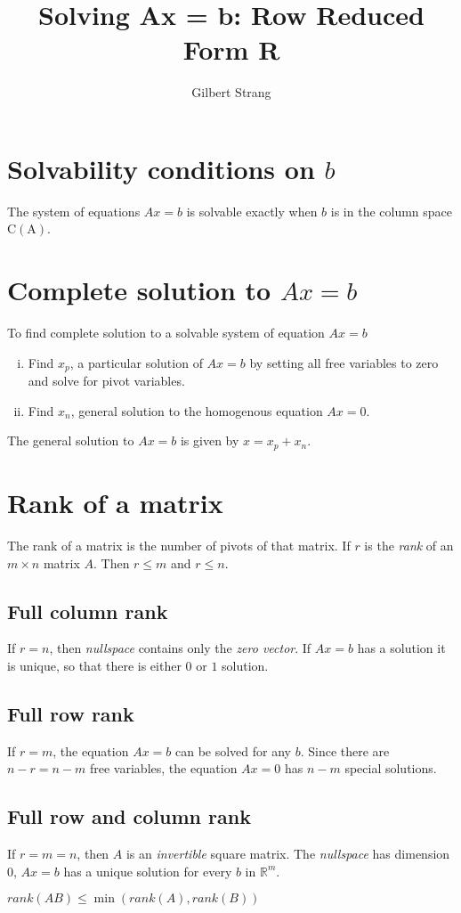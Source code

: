 \documentclass{tufte-handout}
\author{Gilbert Strang}
\title{Solving Ax = b: Row Reduced Form R}
\begin{document}
\maketitle

\section{Solvability conditions on $b$}
The system of equations $Ax = b$ is solvable exactly when $b$ is in
the column space $\mathrm{C(A)}$.

\section{Complete solution to $Ax = b$}
To find complete solution to a solvable system of equation $Ax = b$

\begin{enumerate}[(i)]
\item Find $x_p$, a particular solution of $Ax = b$ by setting all
free variables to zero and solve for pivot variables.

\item Find $x_n$, general solution to the homogenous equation
$Ax = 0$.
\end{enumerate}

The general solution to $Ax = b$ is given by $x = x_p + x_n$.
\section{Rank of a matrix}
The rank of a matrix is the number of pivots of that matrix. If $r$
is the \emph{rank} of an $m \times n$ matrix $A$. Then $r \leq m$ and
$r \leq n$.

\subsection{Full column rank}
If $r = n$, then \emph{nullspace} contains only the \emph{zero vector}.
If $Ax = b$ has a solution it is unique, so that there is either $0$ or
$1$ solution.

\subsection{Full row rank}
If $r = m$, the equation $Ax = b$ can be solved for any $b$. Since there
are $n - r = n - m$ free variables, the equation $Ax = 0$ has $n - m$
special solutions.

\subsection{Full row and column rank}
If $r = m = n$, then $A$ is an \emph{invertible} square matrix. The
\emph{nullspace} has dimension $0$, $Ax = b$ has a unique solution for
every $b$ in $\mathbb{R}^m$.

\newthought{}$rank(AB) \leq \min(rank(A), rank(B))$
\end{document}
